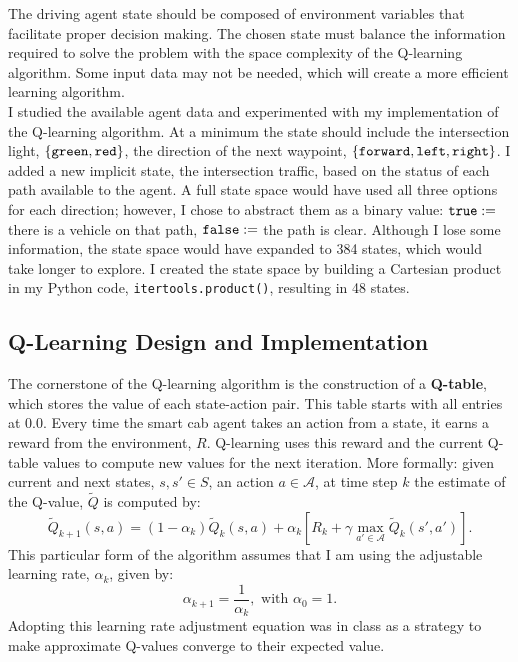 \documentclass[12pt,letterpaper]{article}
\begin{document}
The driving agent state should be composed of environment variables that facilitate proper decision making.
The chosen state must balance the information required to solve the problem with the space complexity of the Q-learning algorithm.
Some input data may not be needed, which will create a more efficient learning algorithm. \\

I studied the available agent data and experimented with my implementation of the Q-learning algorithm.
At a minimum the state should include the intersection light, $\{\verb|green|,\verb|red|\}$, the direction of the next waypoint, $\{\verb|forward|,\verb|left|,\verb|right|\}$.
I added a new implicit state, the intersection traffic, based on the status of each path available to the agent.
A full state space would have used all three options for each direction; however, I chose to abstract them as a binary value: $\verb|true| := $ there is a vehicle on that path, $\verb|false|:=$ the path is clear.
Although I lose some information, the state space would have expanded to 384 states, which would take longer to explore.
I created the state space by building a Cartesian product in my Python code, \verb|itertools.product()|, resulting in 48 states.

\subsection*{Q-Learning Design and Implementation}

The cornerstone of the Q-learning algorithm is the construction of a {\bf Q-table}, which stores the value of each state-action pair.
This table starts with all entries at $0.0$.
Every time the smart cab agent takes an action from a state, it earns a reward from the environment, $R$.
Q-learning uses this reward and the current Q-table values to compute new values for the next iteration.
More formally: given current and next states, $s,s'\in S$, an action $a\in \mathcal{A}$, at time step $k$ the estimate of the Q-value, $\tilde{Q}$ is computed by:
$$
	\tilde{Q}_{k+1}(s,a) = (1-\alpha_k)\tilde{Q}_{k}(s,a) + \alpha_k[R_k + \gamma \max_{a'\in\mathcal{A}}\tilde{Q}_k(s',a')].
$$
This particular form of the algorithm assumes that I am using the adjustable learning rate, $\alpha_k$, given by:
$$
	\alpha_{k+1} = \frac{1}{\alpha_k}, \textrm{ with } \alpha_0 = 1.
$$
Adopting this learning rate adjustment equation was in class as a strategy to make approximate Q-values converge to their expected value.
\end{document}
